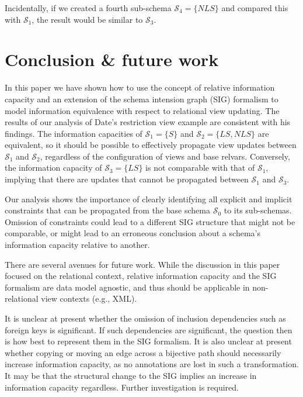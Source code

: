 \documentclass{sig-alternate-05-2015}
\newcounter{constraint}
\newcommand{\LS}{\ensuremath{\mathit{LS}}}
\newcommand{\NLS}{\ensuremath{\mathit{NLS}}}
\newcommand{\SC}[1]{\ensuremath{\mathcal{S}_{#1}}}
\begin{document}
Incidentally, if we created a fourth sub-schema \(\SC{4} = \{\NLS\}\) and compared this with \(\SC{1}\), the result would be similar to \(\SC{3}\).





\section{Conclusion \& future work}
\label{sec-conclusion}


\noindent In this paper we have shown how to use the concept of relative information capacity and an extension of the schema intension graph (SIG) formalism to model information equivalence with respect to relational view updating. The results of our analysis of Date's restriction view example \cite{Date.C-2013a-View} are consistent with his findings. The information capacities of \(\SC{1} = \{S\}\) and \(\SC{2} = \{\LS,\NLS\}\) are equivalent, so it should be possible to effectively propagate view updates between \(\SC{1}\) and \(\SC{2}\), regardless of the configuration of views and base relvars. Conversely, the information capacity of \(\SC{3} = \{\LS\}\) is not comparable with that of \(\SC{1}\), implying that there are updates that cannot be propagated between \(\SC{1}\) and \(\SC{3}\).

Our analysis shows the importance of clearly identifying all explicit and implicit constraints that can be propagated from the base schema \(\SC{0}\) to its sub-schemas. Omission of constraints could lead to a different SIG structure that might not be comparable, or might lead to an erroneous conclusion about a schema's information capacity relative to another.

There are several avenues for future work. While the discussion in this paper focused on the relational context, relative information capacity and the SIG formalism are data model agnostic, and thus should be applicable in non-relational view contexts (e.g., XML).

It is unclear at present whether the omission of inclusion dependencies such as foreign keys is significant. If such dependencies are significant, the question then is how best to represent them in the SIG formalism. It is also unclear at present whether copying or moving an edge across a bijective path should necessarily increase information capacity, as no annotations are lost in such a transformation. It may be that the structural change to the SIG implies an increase in information capacity regardless. Further investigation is required.
\end{document}
